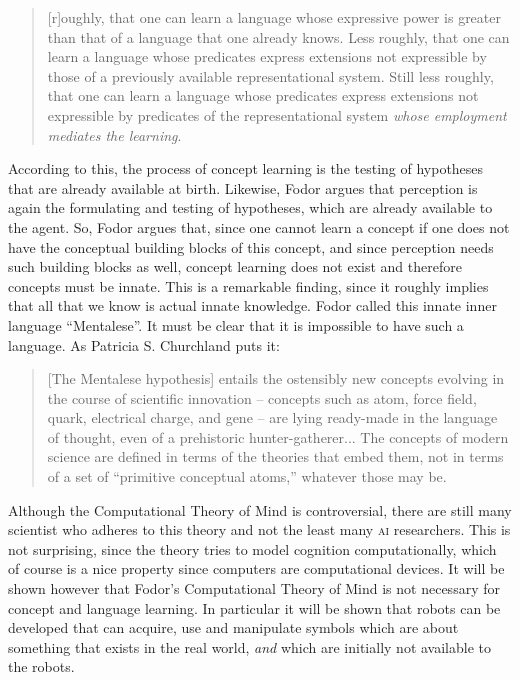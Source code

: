 
\begin{quote}
[r]oughly, that one can learn a language whose expressive power is greater than that of a language that one already knows. Less roughly, that one can learn a language whose predicates express extensions not expressible by those of a previously available representational system. Still less roughly, that one can learn a language whose predicates express extensions not expressible by predicates of the representational system {\em whose employment mediates the learning}. \citep[86, Fodor's italics]{fodor:1975}
\end{quote}


According to this, the process of concept learning is the testing of hypotheses that are already available at birth. Likewise, Fodor argues that perception is again the formulating and testing of hypotheses, which are already available to the agent. So, Fodor argues that, since one cannot learn a concept if one does not have the conceptual building blocks of this concept, and since perception needs such building blocks as well, concept learning does not exist and therefore concepts must be innate. This is a remarkable finding, since it roughly implies that all that we know is actual innate knowledge. Fodor called this innate inner language ``Mentalese''. It must be clear that it is impossible to have such a language. As Patricia S. Churchland puts it:

\begin{quote}
[The Mentalese hypothesis] entails the ostensibly new concepts evolving in the course of scientific innovation -- concepts such as atom, force field, quark, electrical charge, and gene -- are lying ready-made in the language of thought, even of a prehistoric hunter-gatherer... The concepts of modern science are defined in terms of the theories that embed them, not in terms of a set of ``primitive conceptual atoms,'' whatever those may be. \citep[389]{p.s.churchland:1986}
\end{quote}


Although the Computational Theory of Mind is controversial, there are still many scientist who adheres to this theory and not the least many {\scshape ai} researchers. This is not surprising, since the theory tries to model cognition computationally, which of course is a nice property since computers are computational devices. It will be shown however that Fodor's Computational Theory of Mind is not necessary for concept and language learning. In particular it will be shown that robots can be developed that can acquire, use and manipulate symbols which are about something that exists in the real world, {\em and} which are initially not available to the robots.
	
